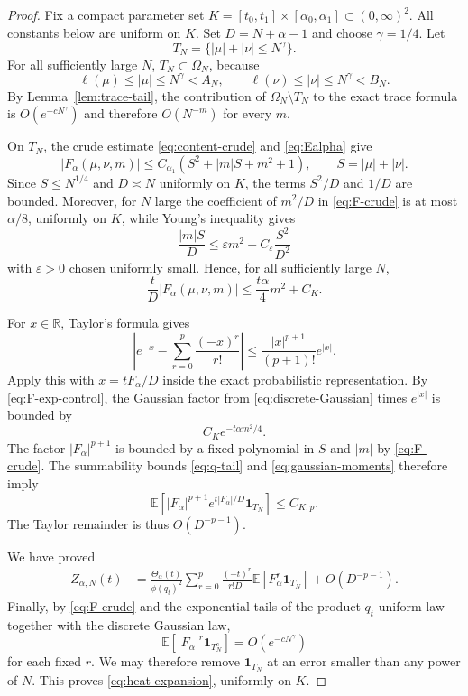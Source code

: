 \documentclass[10pt,a4paper]{amsart}
\newcommand\E{{\mathbb E}}
\newcommand\R{{\mathbb R}}
\newcommand\ellpart{{\ell}}
\newcommand\one{{\mathbf 1}}
\begin{document}
\begin{proof}
Fix a compact parameter set $K=[t_0,t_1]\times[\alpha_0,\alpha_1]\subset(0,\infty)^2$.  All constants below are uniform on $K$.  Set $D=N+\alpha-1$ and choose $\gamma=1/4$.  Let
\[
T_N=\{|\mu|+|\nu|\leq N^\gamma\}.
\]
For all sufficiently large $N$, $T_N\subset\Omega_N$, because
\[
\ellpart(\mu)\leq|\mu|\leq N^\gamma<A_N, \qquad \ellpart(\nu)\leq|\nu|\leq N^\gamma<B_N.
\]
By Lemma~\ref{lem:trace-tail}, the contribution of $\Omega_N\setminus T_N$ to the exact trace formula is $O(e^{-cN^\gamma})$ and therefore $O(N^{-m})$ for every $m$.

On $T_N$, the crude estimate \eqref{eq:content-crude} and \eqref{eq:Ealpha} give
\begin{equation}\label{eq:F-crude}
|F_\alpha(\mu,\nu,m)| \leq C_{\alpha_1}\left(S^2+|m|S+m^2+1\right), \qquad S=|\mu|+|\nu|.
\end{equation}
Since $S\leq N^{1/4}$ and $D\asymp N$ uniformly on $K$, the terms $S^2/D$ and $1/D$ are bounded.  Moreover, for $N$ large the coefficient of $m^2/D$ in \eqref{eq:F-crude} is at most $\alpha/8$, uniformly on $K$, while Young's inequality gives
\[
\frac{|m|S}{D}\leq \varepsilon m^2+C_\varepsilon\frac{S^2}{D^2}
\]
with $\varepsilon>0$ chosen uniformly small.  Hence, for all sufficiently large $N$,
\begin{equation}\label{eq:F-exp-control}
\frac{t}{D}|F_\alpha(\mu,\nu,m)| \leq \frac{t\alpha}{4}m^2+C_K.
\end{equation}

For $x\in\R$, Taylor's formula gives
\begin{equation}\label{eq:Taylor-bound}
\left|e^{-x}-\sum_{r=0}^{p}\frac{(-x)^r}{r!}\right| \leq \frac{|x|^{p+1}}{(p+1)!}e^{|x|}.
\end{equation}
Apply this with $x=tF_\alpha/D$ inside the exact probabilistic representation.  By \eqref{eq:F-exp-control}, the Gaussian factor from \eqref{eq:discrete-Gaussian} times $e^{|x|}$ is bounded by
\[
C_K e^{-t\alpha m^2/4}.
\]
The factor $|F_\alpha|^{p+1}$ is bounded by a fixed polynomial in $S$ and $|m|$ by \eqref{eq:F-crude}.  The summability bounds \eqref{eq:q-tail} and \eqref{eq:gaussian-moments} therefore imply
\[
\E\left[ |F_\alpha|^{p+1}e^{t|F_\alpha|/D}\one_{T_N} \right]\leq C_{K,p}.
\]
The Taylor remainder is thus $O(D^{-p-1})$.

We have proved
\begin{align*}
Z_{\alpha,N}(t)
&=\frac{\Theta_\alpha(t)}{\phi(q_t)^2}
\sum_{r=0}^{p}\frac{(-t)^r}{r!D^r}
\E\left[F_\alpha^r\one_{T_N}\right]
+O(D^{-p-1}).
\end{align*}
Finally, by \eqref{eq:F-crude} and the exponential tails of the product $q_t$-uniform law together with the discrete Gaussian law,
\[
\E\left[|F_\alpha|^r\one_{T_N^c}\right] =O(e^{-cN^\gamma})
\]
for each fixed $r$.  We may therefore remove $\one_{T_N}$ at an error smaller than any power of $N$.  This proves \eqref{eq:heat-expansion}, uniformly on $K$.
\end{proof}
\end{document}

